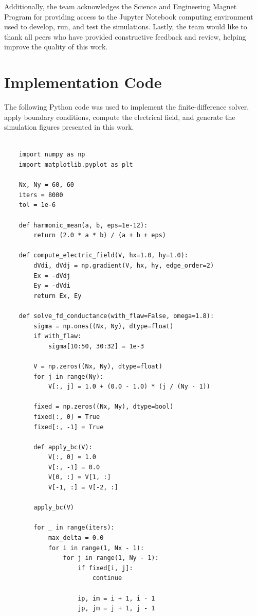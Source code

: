 \documentclass[reprint,amsmath,amssymb,aps]{revtex4-2}
\begin{document}
Additionally, the team acknowledges the Science and Engineering Magnet Program for providing access to the Jupyter Notebook computing environment used to develop, run, and test the simulations. Lastly, the team would like to thank all peers who have provided constructive feedback and review, helping improve the quality of this work. 

\appendix
\section{Implementation Code}
The following Python code was used to implement the finite-difference solver, apply boundary conditions, compute the electrical field, and generate the simulation figures presented in this work.

\begin{lstlisting}

    import numpy as np
    import matplotlib.pyplot as plt
    
    Nx, Ny = 60, 60
    iters = 8000
    tol = 1e-6
    
    def harmonic_mean(a, b, eps=1e-12):
        return (2.0 * a * b) / (a + b + eps)
    
    def compute_electric_field(V, hx=1.0, hy=1.0):
        dVdi, dVdj = np.gradient(V, hx, hy, edge_order=2)
        Ex = -dVdj 
        Ey = -dVdi
        return Ex, Ey
    
    def solve_fd_conductance(with_flaw=False, omega=1.8):
        sigma = np.ones((Nx, Ny), dtype=float)
        if with_flaw:
            sigma[10:50, 30:32] = 1e-3
    
        V = np.zeros((Nx, Ny), dtype=float)
        for j in range(Ny):
            V[:, j] = 1.0 + (0.0 - 1.0) * (j / (Ny - 1))
    
        fixed = np.zeros((Nx, Ny), dtype=bool)
        fixed[:, 0] = True
        fixed[:, -1] = True
    
        def apply_bc(V):
            V[:, 0] = 1.0  
            V[:, -1] = 0.0
            V[0, :] = V[1, :]      
            V[-1, :] = V[-2, :]    
    
        apply_bc(V)
    
        for _ in range(iters):
            max_delta = 0.0
            for i in range(1, Nx - 1):
                for j in range(1, Ny - 1):
                    if fixed[i, j]:
                        continue
    
                    ip, im = i + 1, i - 1
                    jp, jm = j + 1, j - 1
    

\end{lstlisting}
\end{document}
